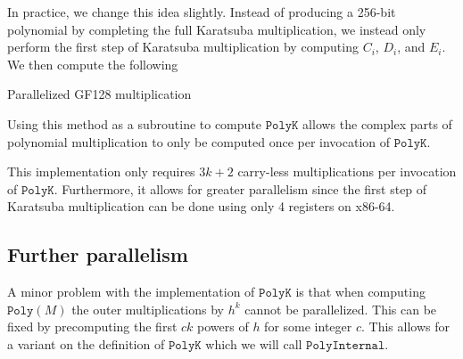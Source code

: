 \documentclass[hctr.tex]{subfiles}
\begin{document}
In practice, we change this idea slightly. Instead of producing a 256-bit polynomial by completing the full Karatsuba multiplication, we instead only perform the first step of Karatsuba multiplication by computing $C_i$, $D_i$, and $E_i$. We then compute the following
\begin{algorithm}[H]
	\caption{Parallelized GF128 multiplication}\label{parallelgf128}
\end{algorithm}
Using this method as a subroutine to compute $\texttt{PolyK}$ allows the complex parts of polynomial multiplication to only be computed once per invocation of $\texttt{PolyK}$.

This implementation only requires $3k + 2$ carry-less multiplications per invocation of $\texttt{PolyK}$. Furthermore, it allows for greater parallelism since the first step of Karatsuba multiplication can be done using only 4 registers on x86-64.

\subsection{Further parallelism}
A minor problem with the implementation of $\texttt{PolyK}$ is that when computing $\texttt{Poly}(M)$ the outer multiplications by $h^{k}$ cannot be parallelized. This can be fixed by precomputing the first $ck$ powers of $h$ for some integer $c$. This allows for a variant on the definition of $\texttt{PolyK}$ which we will call $\texttt{PolyInternal}$.
\end{document}
